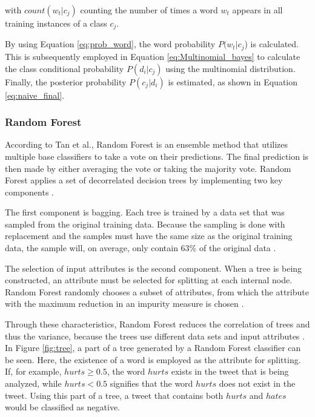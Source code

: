         with $count(w_t|c_j)$ counting the number of times a word $w_t$ appears in all training instances of a class $c_j$.
        
        By using Equation \eqref{eq:prob_word}, the word probability $P(w_t|c_j$) is calculated. This is subsequently employed in Equation \eqref{eq:Multinomial_bayes} to calculate the class conditional probability $P(d_i|c_j)$ using the multinomial distribution. Finally, the posterior probability $P(c_j|d_i)$ is estimated, as shown in Equation \eqref{eq:naive_final}.
        
\subsubsection{Random Forest}
        According to Tan et al., Random Forest is an ensemble method that utilizes multiple base classifiers to take a vote on their predictions. The final prediction is then made by either averaging the vote or taking the majority vote. Random Forest applies a set of decorrelated decision trees by implementing two key components \cite{DBLP:books/aw/TanSKK2019}.
        
        The first component is bagging. Each tree is trained by a data set that was sampled from the original training data. Because the sampling is done with replacement and the samples must have the same size as the original training data, the sample will, on average, only contain 63\% of the original data \cite{DBLP:books/aw/TanSKK2019}.
        
        The selection of input attributes is the second component. When a tree is being constructed, an attribute must be selected for splitting at each internal node. Random Forest randomly chooses a subset of attributes, from which the attribute with the maximum reduction in an impurity measure is chosen \cite{DBLP:books/aw/TanSKK2019}.
        
        Through these characteristics, Random Forest reduces the correlation of trees and thus the variance, because the trees use different data sets and input attributes \cite{DBLP:books/aw/TanSKK2019}. In Figure \ref{fig:tree}, a part of a tree generated by a Random Forest classifier can be seen. Here, the existence of a word is employed as the attribute for splitting. If, for example, $hurts \geq 0.5$, the word $hurts$ exists in the tweet that is being analyzed, while $hurts < 0.5$ signifies that the word $hurts$ does not exist in the tweet. Using this part of a tree, a tweet that contains both $hurts$ and $hates$ would be classified as negative.
        
